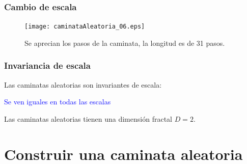 \begin{frame}
\frametitle{Cambio de escala}
\begin{figure}
	\centering
	\texttt{[image: caminataAleatoria\_06.eps]}
	\caption{Se aprecian los pasos de la caminata, la longitud es de 31 pasos.}
\end{figure}
\end{frame}
\begin{frame}
\frametitle{Invariancia de escala}
Las caminatas aleatorias son invariantes de escala:
\\
\bigskip
\begin{center}
\textcolor{blue}{Se ven iguales en todas las escalas}
\end{center}
\pause
Las caminatas aleatorias tienen una dimensión fractal $D = 2$.
\end{frame}
\section{Construir una caminata aleatoria}
